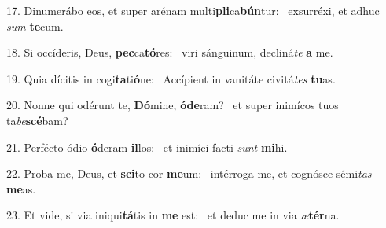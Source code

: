 17. Dinumerábo eos, et super arénam multi\textbf{pli}ca\textbf{bún}tur: \ast\  exsurréxi, et adhuc \textit{sum} \textbf{te}cum.\

18. Si occíderis, Deus, \textbf{pec}ca\textbf{tó}res: \ast\  viri sánguinum, decliná\textit{te} \textbf{a} me.\

19. Quia dícitis in cogi\textbf{ta}ti\textbf{ó}ne: \ast\  Accípient in vanitáte civitá\textit{tes} \textbf{tu}as.\

20. Nonne qui odérunt te, \textbf{Dó}mine, \textbf{ó}\textbf{de}ram? \ast\  et super inimícos tuos ta\textit{be}\textbf{scé}bam?\

21. Perfécto ódio \textbf{ó}deram \textbf{il}los: \ast\  et inimíci facti \textit{sunt} \textbf{mi}hi.\

22. Proba me, Deus, et \textbf{sci}to cor \textbf{me}um: \ast\  intérroga me, et cognósce sémi\textit{tas} \textbf{me}as.\

23. Et vide, si via iniqui\textbf{tá}tis in \textbf{me} est: \ast\  et deduc me in via \textit{æ}\textbf{tér}na.\

